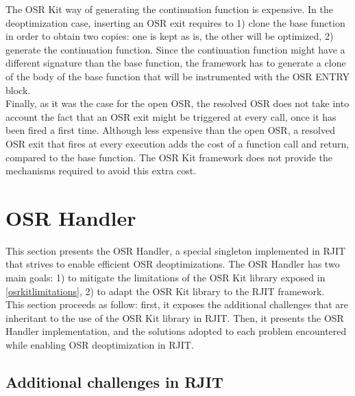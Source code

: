 The OSR Kit way of generating the continuation function is expensive.
In the deoptimization case, inserting an OSR exit requires to 1) clone the base function in order to obtain two copies: one is kept as is, the other will be optimized, 2) generate the continuation function. 
Since the continuation function might have a different signature than the base function, the framework has to generate a clone of the body of the base function that will be instrumented with the OSR ENTRY block.\\

Finally, as it was the case for the open OSR, the resolved OSR does not take into account the fact that an OSR exit might be triggered at every call, once it has been fired a first time.
Although less expensive than the open OSR, a resolved OSR exit that fires at every execution adds the cost of a function call and return, compared to the base function.
The OSR Kit framework does not provide the mechanisms required to avoid this extra cost.\\

\section{OSR Handler}
This section presents the OSR Handler, a special singleton implemented in RJIT that strives to enable efficient OSR deoptimizations. 
The OSR Handler has two main goals: 1) to mitigate the limitations of the OSR Kit\cite{OSRKit} library exposed in \ref{osrkitlimitations}, 2) to adapt the OSR Kit library to the RJIT framework.\\

This section proceeds as follow: first, it exposes the additional challenges that are inheritant to the use of the OSR Kit library in RJIT.
Then, it presents the OSR Handler implementation, and the solutions adopted to each problem encountered while enabling OSR deoptimization in RJIT.\\
 
\subsection{Additional challenges in RJIT}\label{additionalchallenges}

